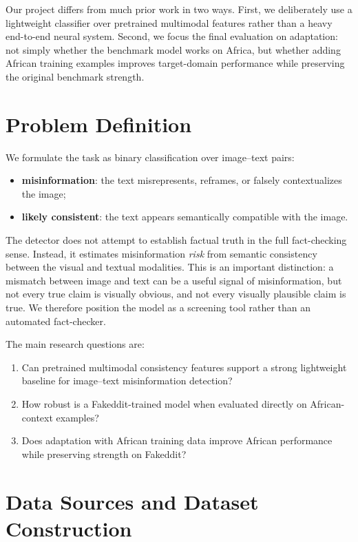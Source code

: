 \documentclass[a4paper,10.5pt,twoside]{article}
\begin{document}
Our project differs from much prior work in two ways. First, we deliberately use a lightweight classifier over pretrained multimodal features rather than a heavy end-to-end neural system. Second, we focus the final evaluation on adaptation: not simply whether the benchmark model works on Africa, but whether adding African training examples improves target-domain performance while preserving the original benchmark strength.

\section{Problem Definition}
We formulate the task as binary classification over image--text pairs:
\begin{itemize}[leftmargin=1.5em]
    \item \textbf{misinformation}: the text misrepresents, reframes, or falsely contextualizes the image;
    \item \textbf{likely consistent}: the text appears semantically compatible with the image.
\end{itemize}

The detector does not attempt to establish factual truth in the full fact-checking sense. Instead, it estimates misinformation \emph{risk} from semantic consistency between the visual and textual modalities. This is an important distinction: a mismatch between image and text can be a useful signal of misinformation, but not every true claim is visually obvious, and not every visually plausible claim is true. We therefore position the model as a screening tool rather than an automated fact-checker.

The main research questions are:
\begin{enumerate}[leftmargin=1.5em]
    \item Can pretrained multimodal consistency features support a strong lightweight baseline for image--text misinformation detection?
    \item How robust is a Fakeddit-trained model when evaluated directly on African-context examples?
    \item Does adaptation with African training data improve African performance while preserving strength on Fakeddit?
\end{enumerate}

\section{Data Sources and Dataset Construction}
\end{document}
